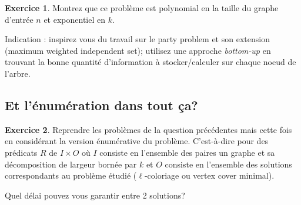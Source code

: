 \documentclass[a4paper,12pt]{article}
\theoremstyle{definition}
\newtheorem{exo}{Exercice}%
\theoremstyle{remark}
\begin{document}
\begin{exo}
  Montrez que ce problème est polynomial en la taille du graphe
  d'entrée $n$ et exponentiel en $k$.

  Indication : inspirez vous du travail sur le party problem et son
  extension (maximum weighted independent set); utilisez une approche
  \textsl{bottom-up} en trouvant la bonne quantité d'information à
  stocker/calculer sur chaque noeud de l'arbre.
\end{exo}




\subsection*{Et l'énumération dans tout ça?}

\begin{exo}
  Reprendre les problèmes de la question précédentes mais cette fois
  en considérant la version énumérative du problème.
  C'est-à-dire pour des prédicats $R$ de $I\times O$ où $I$ consiste
  en l'ensemble des paires un graphe et sa décomposition de largeur
  bornée par $k$ et $O$ consiste en l'ensemble des solutions
  correspondants au problème étudié ($\ell$-coloriage ou vertex cover
  minimal). 

  Quel délai pouvez vous garantir entre 2 solutions?
\end{exo}
\end{document}
